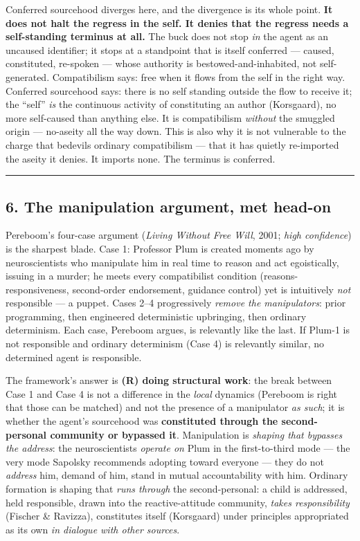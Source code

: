 \documentclass[11pt]{article}
\begin{document}
Conferred sourcehood diverges here, and the divergence is its whole point. \textbf{It does not halt the regress in the self. It denies that the regress needs a self-standing terminus at all.} The buck does not stop \emph{in} the agent as an uncaused identifier; it stops at a standpoint that is itself conferred — caused, constituted, re-spoken — whose authority is bestowed-and-inhabited, not self-generated. Compatibilism says: free when it flows from the self in the right way. Conferred sourcehood says: there is no self standing outside the flow to receive it; the ``self'' \emph{is} the continuous activity of constituting an author (Korsgaard), no more self-caused than anything else. It is compatibilism \emph{without} the smuggled origin — no-aseity all the way down. This is also why it is not vulnerable to the charge that bedevils ordinary compatibilism — that it has quietly re-imported the aseity it denies. It imports none. The terminus is conferred.

\medskip\noindent\rule{\linewidth}{0.3pt}\medskip

\subsection*{6. The manipulation argument, met head-on}

Pereboom's four-case argument (\emph{Living Without Free Will}, 2001; \emph{high confidence}) is the sharpest blade. Case 1: Professor Plum is created moments ago by neuroscientists who manipulate him in real time to reason and act egoistically, issuing in a murder; he meets every compatibilist condition (reasons-responsiveness, second-order endorsement, guidance control) yet is intuitively \emph{not} responsible — a puppet. Cases 2–4 progressively \emph{remove the manipulators}: prior programming, then engineered deterministic upbringing, then ordinary determinism. Each case, Pereboom argues, is relevantly like the last. If Plum-1 is not responsible and ordinary determinism (Case 4) is relevantly similar, no determined agent is responsible.

The framework's answer is \textbf{(R) doing structural work}: the break between Case 1 and Case 4 is not a difference in the \emph{local} dynamics (Pereboom is right that those can be matched) and not the presence of a manipulator \emph{as such}; it is whether the agent's sourcehood was \textbf{constituted through the second-personal community or bypassed it}. Manipulation is \emph{shaping that bypasses the address}: the neuroscientists \emph{operate on} Plum in the first-to-third mode — the very mode Sapolsky recommends adopting toward everyone — they do not \emph{address} him, demand of him, stand in mutual accountability with him. Ordinary formation is shaping that \emph{runs through} the second-personal: a child is addressed, held responsible, drawn into the reactive-attitude community, \emph{takes responsibility} (Fischer \& Ravizza), constitutes itself (Korsgaard) under principles appropriated as its own \emph{in dialogue with other sources}.
\end{document}

